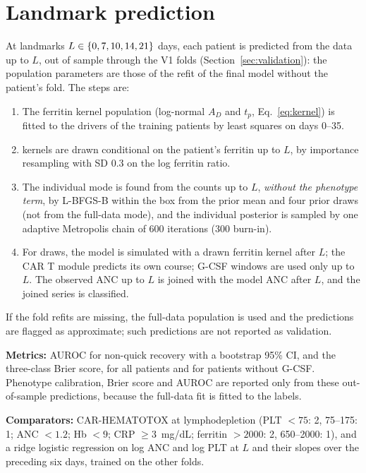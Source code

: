 \documentclass[11pt]{article}
\begin{document}
\section{Landmark prediction}\label{sec:landmark}
At landmarks $L\in\{0, 7, 10, 14, 21\}$ days, each patient is predicted from the data up to $L$, out of sample through the V1 folds (Section~\ref{sec:validation}): the population parameters are those of the refit of the final model without the patient's fold. The steps are:
\begin{enumerate}
\item The ferritin kernel population (log-normal $A_D$ and $t_p$, Eq.~\ref{eq:kernel}) is fitted to the drivers of the training patients by least squares on days 0--35.
\item \valFKernel{} kernels are drawn conditional on the patient's ferritin up to $L$, by importance resampling with SD 0.3 on the log ferritin ratio.
\item The individual mode is found from the counts up to $L$, \emph{without the phenotype term}, by L-BFGS-B within the box from the prior mean and four prior draws (not from the full-data mode), and the individual posterior is sampled by one adaptive Metropolis chain of 600 iterations (300 burn-in).
\item For \valFDraws{} draws, the model is simulated with a drawn ferritin kernel after $L$; the CAR T module predicts its own course; G-CSF windows are used only up to $L$. The observed ANC up to $L$ is joined with the model ANC after $L$, and the joined series is classified.
\end{enumerate}
If the fold refits are missing, the full-data population is used and the predictions are flagged as approximate; such predictions are not reported as validation.

\textbf{Metrics:} AUROC for non-quick recovery with a bootstrap 95\% CI, and the three-class Brier score, for all patients and for patients without G-CSF. Phenotype calibration, Brier score and AUROC are reported only from these out-of-sample predictions, because the full-data fit is fitted to the labels.

\textbf{Comparators:} CAR-HEMATOTOX at lymphodepletion \citep{rejeski2021} (PLT $<75$: 2, 75--175: 1; ANC $<1.2$; Hb $<9$; CRP $\geq3$~mg/dL; ferritin $>2000$: 2, 650--2000: 1), and a ridge logistic regression on log ANC and log PLT at $L$ and their slopes over the preceding six days, trained on the other folds.
\end{document}
